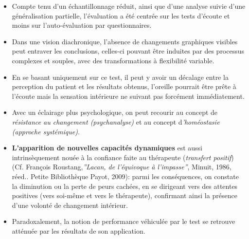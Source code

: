   \begin{itemize}
  
\item Compte tenu  d'un échantillonnage réduit, ainsi que d'une analyse
  suivie d'une généralisation partielle, l'évaluation a été centrée sur les
  tests d'écoute et moins sur
  l'auto-évaluation par questionnaires.

\item   Dans une vision diachronique, l'absence de changements graphiques
 visibles 
 peut  entraver les conclusions, celles-ci pouvant être 
 induites par des processus complexes et souples, avec des
 transformations à flexibilité variable.
\item En se basant uniquement sur ce test, il peut y avoir un décalage entre
la perception du patient et les résultats obtenus, l'oreille pourrait
être prête à l'écoute mais la sensation intérieure ne suivant pas
forcément immédiatement.


\item Avec un éclairage plus psychologique, on peut recourir au concept de
\textit{résistance au changement (psychanalyse)} et au concept
d\textit{'homéostasie (approche systémique)}.

\item \textbf{L'apparition de nouvelles
capacités  dynamiques }est aussi intrinsèquement nouée à la confiance
faite au thérapeute (\textit{transfert positif}) (Cf. François
Roustang,\textit{''Lacan, de l'équivoque à l'impasse''}, Minuit, 1986,
réed.. Petite Bibliothèque Payot, 2009): parmi les conséquences, on constate la
diminution ou la perte de peurs cachées,  en se dirigeant vers des
attentes positives (vers soi-même et vers le thérapeute), confirmant ainsi la
présence d'une volonté de changement intérieur.

\item Paradoxalement, la notion de performance véhiculée par le test se
  retrouve atténuée par les résultats de son application.
  \end{itemize}





